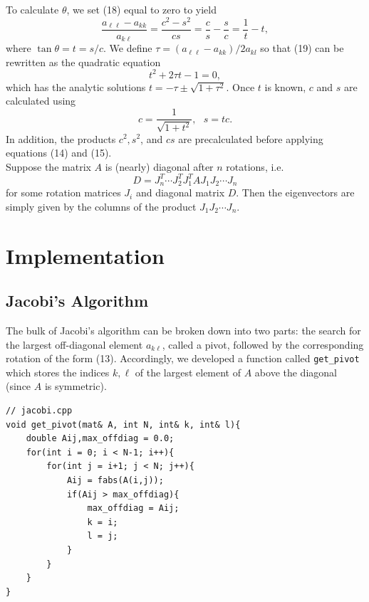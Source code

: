 \documentclass[prb,aps,twocolumn,showpacs,10pt]{revtex4-1}
\begin{document}
To calculate $\theta$, we set (18) equal to zero to yield
\begin{equation}
\frac{a_{\ell\ell}-a_{kk}}{a_{k\ell}} = \frac{c^2-s^2}{cs} = \frac{c}{s}-\frac{s}{c} = \frac{1}{t}-t,
\end{equation}
where $\tan\theta=t=s/c$. We define $\tau = (a_{\ell\ell}-a_{kk})/2a_{kl}$ so that (19) can be rewritten as the quadratic equation
\begin{equation}
t^2+2\tau t - 1 = 0,
\end{equation}
which has the analytic solutions $t=-\tau\pm \sqrt{1+\tau^2}$. Once $t$ is known, $c$ and $s$ are calculated using 
\begin{equation}
c = \frac{1}{\sqrt{1+t^2}}, \ \ \  s=tc.
\end{equation}
In addition, the products $c^2, s^2$, and $cs$ are precalculated before applying equations (14) and (15).\\

Suppose the matrix $A$ is (nearly) diagonal after $n$ rotations, i.e. 
\begin{equation}
D=J_n^T \cdots J_2^T J_1^T A J_1 J_2 \cdots J_n
\end{equation}
for some rotation matrices $J_i$ and diagonal matrix $D$. Then the eigenvectors are simply given by the columns of the product $J_1J_2\cdots J_n$.

\section{Implementation}

\subsection{Jacobi's Algorithm}

The bulk of Jacobi's algorithm can be broken down into two parts: the search for the largest off-diagonal element $a_{k\ell}$, called a pivot, followed by the corresponding rotation of the form (13). Accordingly, we developed a function called \texttt{get\_pivot} which stores the indices $k,\ell$ of the largest element of $A$ above the diagonal (since $A$ is symmetric).

\begin{lstlisting}
// jacobi.cpp
void get_pivot(mat& A, int N, int& k, int& l){
	double Aij,max_offdiag = 0.0;
	for(int i = 0; i < N-1; i++){
		for(int j = i+1; j < N; j++){
			Aij = fabs(A(i,j));
			if(Aij > max_offdiag){
				max_offdiag = Aij;
				k = i;
				l = j;
			}
		}
	}
}
\end{lstlisting}
\end{document}
